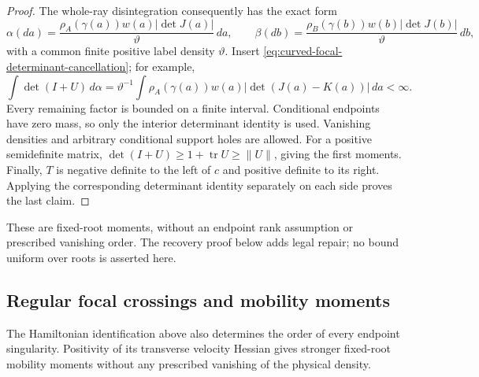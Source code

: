 \documentclass[11pt,reqno]{amsart}
\theoremstyle{definition}
\theoremstyle{remark}
\numberwithin{equation}{section}
\begin{document}
\begin{proof}
The whole-ray disintegration consequently has the exact form
\[
 \alpha(da)=\frac{\rho_A(\gamma(a))w(a)|\det J(a)|}{\vartheta}\,da,
 \qquad
 \beta(db)=\frac{\rho_B(\gamma(b))w(b)|\det J(b)|}{\vartheta}\,db,
\]
with a common finite positive label density \(\vartheta\).
Insert \eqref{eq:curved-focal-determinant-cancellation}; for example,
\[
 \int\det(I+U)\,d\alpha
 =\vartheta^{-1}\int\rho_A(\gamma(a))w(a)
                    |\det(J(a)-K(a))|\,da<\infty.
\]
Every remaining factor is bounded on a finite interval. Conditional
endpoints have zero mass, so only the interior determinant identity
is used. Vanishing densities and arbitrary conditional support holes
are allowed. For a positive semidefinite matrix,
\(\det(I+U)\ge1+\operatorname{tr}U\ge\|U\|\), giving the first
moments. Finally, \(T\) is negative definite to the left of \(c\)
and positive definite to its right. Applying the corresponding
determinant identity separately on each side proves the last claim.
\end{proof}

These are fixed-root moments, without an endpoint rank assumption or
prescribed vanishing order. The recovery proof below adds legal repair;
no bound uniform over roots is asserted here.

\subsection{Regular focal crossings and mobility moments}
\label{subsec:regular-focal-crossing-moments}

The Hamiltonian identification above also determines the order of every
endpoint singularity. Positivity of its transverse velocity Hessian
gives stronger fixed-root mobility moments without any prescribed
vanishing of the physical density.
\end{document}
